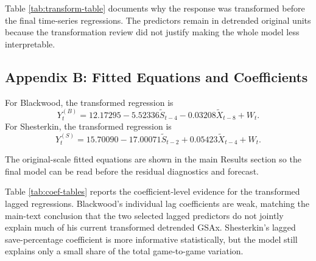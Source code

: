 \documentclass[
  10pt,
]{article}
\begin{document}
Table \ref{tab:transform-table} documents why the response was transformed before the final time-series regressions. The predictors remain in detrended original units because the transformation review did not justify making the whole model less interpretable.

\subsection{Appendix B: Fitted Equations and Coefficients}\label{appendix-b-fitted-equations-and-coefficients}

For Blackwood, the transformed regression is
\[
Y^{(B)}_t = 12.17295 - 5.52336 \tilde{S}_{t-4} - 0.03208 \tilde{X}_{t-8} + W_t.
\]
For Shesterkin, the transformed regression is
\[
Y^{(S)}_t = 15.70090 - 17.00071 \tilde{S}_{t-2} + 0.05423 \tilde{X}_{t-4} + W_t.
\]

The original-scale fitted equations are shown in the main Results section so the final model can be read before the residual diagnostics and forecast.

\begin{table}[H]
\centering
\caption{\label{tab:coef-tables}Time-series regression coefficient estimates.}
\centering
{}
\end{table}

Table \ref{tab:coef-tables} reports the coefficient-level evidence for the transformed lagged regressions. Blackwood's individual lag coefficients are weak, matching the main-text conclusion that the two selected lagged predictors do not jointly explain much of his current transformed detrended GSAx. Shesterkin's lagged save-percentage coefficient is more informative statistically, but the model still explains only a small share of the total game-to-game variation.
\end{document}
